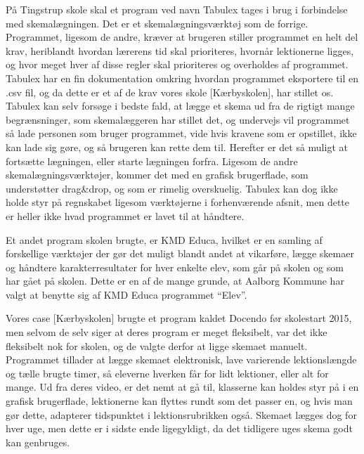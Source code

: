 På Tingstrup skole skal et program ved navn Tabulex tages i brug i forbindelse med skemalægningen. Det er et skemalægningsværktøj som de forrige. Programmet, ligesom de andre, kræver at brugeren stiller programmet en helt del krav, heriblandt hvordan lærerens tid skal prioriteres, hvornår lektionerne ligges, og hvor meget hver af disse regler skal prioriteres og overholdes af programmet\cite{Tabulex}. Tabulex har en fin dokumentation omkring hvordan programmet eksportere til en .csv fil\cite{Tabulex_csv}, og da dette er et af de krav vores skole [Kærbyskolen], har stillet os\cite{Interview_Kaerby}. Tabulex kan selv forsøge i bedste fald, at lægge et skema ud fra de rigtigt mange begrænsninger, som skemalæggeren har stillet det, og undervejs vil programmet så lade personen som bruger programmet, vide hvis kravene som er opstillet, ikke kan lade sig gøre, og så brugeren kan rette dem til. Herefter er det så muligt at fortsætte lægningen, eller starte lægningen forfra. Ligesom de andre skemalægningsværktøjer, kommer det med en grafisk brugerflade, som understøtter drag\&drop, og som er rimelig overskuelig. Tabulex kan dog ikke holde styr på regnskabet ligesom værktøjerne i forhenværende afsnit, men dette er heller ikke hvad programmet er lavet til at håndtere.

Et andet program skolen brugte, er KMD Educa, hvilket er en samling af forskellige værktøjer\cite{KMD} der gør det muligt blandt andet at vikarføre, lægge skemaer og håndtere karakterresultater for hver enkelte elev, som går på skolen og som har gået på skolen. Dette er en af de mange grunde, at Aalborg Kommune har valgt at benytte sig af KMD Educa programmet ``Elev''\cite{useCase_KMD_Educa_Elev}.

Vores case [Kærbyskolen] brugte et program kaldet Docendo før skolestart 2015, men selvom de selv siger at deres program er meget fleksibelt\cite{Docendo}, var det ikke fleksibelt nok for skolen, og de valgte derfor at ligge skemaet manuelt. Programmet tillader at lægge skemaet elektronisk, lave varierende lektionslængde og tælle brugte timer, så eleverne hverken får for lidt lektioner, eller alt for mange. Ud fra deres video\cite{Docendo_video}, er det nemt at gå til, klasserne kan holdes styr på i en grafisk brugerflade, lektionerne kan flyttes rundt som det passer en, og hvis man gør dette, adapterer tidspunktet i lektionsrubrikken også. Skemaet lægges dog for hver uge, men dette er i sidste ende ligegyldigt, da det tidligere uges skema godt kan genbruges.
